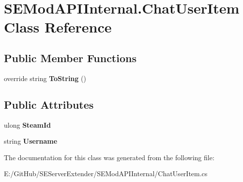 \hypertarget{class_s_e_mod_a_p_i_internal_1_1_chat_user_item}{}\section{S\+E\+Mod\+A\+P\+I\+Internal.\+Chat\+User\+Item Class Reference}
\label{class_s_e_mod_a_p_i_internal_1_1_chat_user_item}
\subsection*{Public Member Functions}
\begin{DoxyCompactItemize}
\item 
\hypertarget{class_s_e_mod_a_p_i_internal_1_1_chat_user_item_ad0268004f8d7747dd7c269f4aa99f652}{}override string {\bfseries To\+String} ()\label{class_s_e_mod_a_p_i_internal_1_1_chat_user_item_ad0268004f8d7747dd7c269f4aa99f652}

\end{DoxyCompactItemize}
\subsection*{Public Attributes}
\begin{DoxyCompactItemize}
\item 
\hypertarget{class_s_e_mod_a_p_i_internal_1_1_chat_user_item_acd06aaedd71293f018be604abebd7653}{}ulong {\bfseries Steam\+Id}\label{class_s_e_mod_a_p_i_internal_1_1_chat_user_item_acd06aaedd71293f018be604abebd7653}

\item 
\hypertarget{class_s_e_mod_a_p_i_internal_1_1_chat_user_item_a63409c7163816df8f34bb9427d09766a}{}string {\bfseries Username}\label{class_s_e_mod_a_p_i_internal_1_1_chat_user_item_a63409c7163816df8f34bb9427d09766a}

\end{DoxyCompactItemize}


The documentation for this class was generated from the following file\+:\begin{DoxyCompactItemize}
\item 
E\+:/\+Git\+Hub/\+S\+E\+Server\+Extender/\+S\+E\+Mod\+A\+P\+I\+Internal/Chat\+User\+Item.\+cs\end{DoxyCompactItemize}
